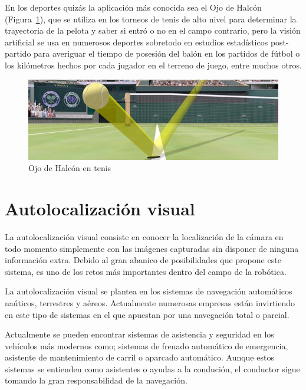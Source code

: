 En los deportes quizás la aplicación más conocida sea el Ojo de Halcón (Figura~\ref{fig:Ojohalcon}), que se utiliza en los torneos de tenis de alto nivel para determinar la trayectoria de la pelota y saber si entró o no en el campo contrario, pero la visión artificial se usa en numerosos deportes sobretodo en estudios estadísticos post-partido para averiguar el tiempo de posesión del balón en los partidos de fútbol o los kilómetros hechos por cada jugador en el terreno de juego, entre muchos otros.

\begin{figure}[th]
\centering
\includegraphics[scale=0.6]{Figures/ojohalcon.jpg}
\decoRule
\caption[Ojohalcon]{Ojo de Halcón en tenis}
\label{fig:Ojohalcon}
\end{figure}

\section{Autolocalización visual}
La autolocalización visual consiste en conocer la localización de la cámara en todo momento simplemente con las imágenes capturadas sin disponer de ninguna información extra. Debido al gran abanico de posibilidades que propone este sistema, es uno de los retos más importantes dentro del campo de la robótica.

La autolocalización visual se plantea en los sistemas de navegación automáticos naúticos, terrestres y aéreos. Actualmente numerosas empresas están invirtiendo en este tipo de sistemas en el que apuestan por una navegación total o parcial.

Actualmente se pueden encontrar sistemas de asistencia y seguridad en los vehículos más modernos como; sistemas de frenado automático de emergencia, asistente de mantenimiento de carril o aparcado automático. Aunque estos sistemas se entienden como asistentes o ayudas a la condución, el conductor sigue tomando la gran responsabilidad de la navegación.

